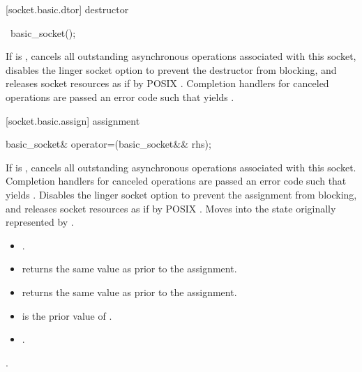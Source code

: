 [socket.basic.dtor]{ destructor}

\begin{itemdecl}
~basic_socket();
\end{itemdecl}

\begin{itemdescr}
\pnum
\effects If  is , cancels all outstanding asynchronous operations associated with this socket, disables the linger socket option to prevent the destructor from blocking, and releases socket resources as if by POSIX . Completion handlers for canceled operations are passed an error code  such that  yields .
\end{itemdescr}



[socket.basic.assign]{ assignment}

\begin{itemdecl}
basic_socket& operator=(basic_socket&& rhs);
\end{itemdecl}

\begin{itemdescr}
\pnum
\effects If  is , cancels all outstanding asynchronous operations associated with this socket. Completion handlers for canceled operations are passed an error code  such that  yields . Disables the linger socket option to prevent the assignment from blocking, and releases socket resources as if by POSIX . Moves into  the state originally represented by .

\pnum
\postconditions 
\begin{itemize}
\item
{}.
\item
{} returns the same value as  prior to the assignment.
\item
{} returns the same value as  prior to the assignment.
\item
{} is the prior value of .
\item
{}.
\end{itemize}

\pnum
\returns {}.
\end{itemdescr}

